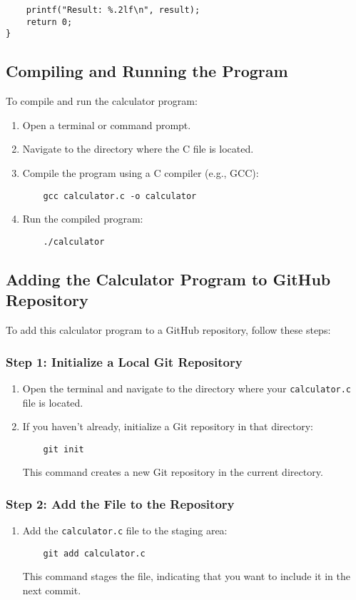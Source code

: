 \documentclass[a4paper,15pt]{article}
\begin{document}
\begin{itemize}[leftmargin=1.5cm]
\begin{verbatim}
    printf("Result: %.2lf\n", result);
    return 0;
}
\end{verbatim}

\subsection{Compiling and Running the Program}
To compile and run the calculator program:
\begin{enumerate}
    \item Open a terminal or command prompt.
    \item Navigate to the directory where the C file is located.
    \item Compile the program using a C compiler (e.g., GCC):
    \begin{verbatim}
    gcc calculator.c -o calculator
    \end{verbatim}
    \item Run the compiled program:
    \begin{verbatim}
    ./calculator
    \end{verbatim}
\end{enumerate}

\subsection{Adding the Calculator Program to GitHub Repository}
To add this calculator program to a GitHub repository, follow these steps:

\subsubsection{Step 1: Initialize a Local Git Repository}
\begin{enumerate}
    \item Open the terminal and navigate to the directory where your \texttt{calculator.c} file is located.
    \item If you haven't already, initialize a Git repository in that directory:
    \begin{verbatim}
    git init
    \end{verbatim}
    This command creates a new Git repository in the current directory.
\end{enumerate}

\subsubsection{Step 2: Add the File to the Repository}
\begin{enumerate}
    \item Add the \texttt{calculator.c} file to the staging area:
    \begin{verbatim}
    git add calculator.c
    \end{verbatim}
    This command stages the file, indicating that you want to include it in the next commit.
\end{enumerate}


\end{itemize}
\end{document}
